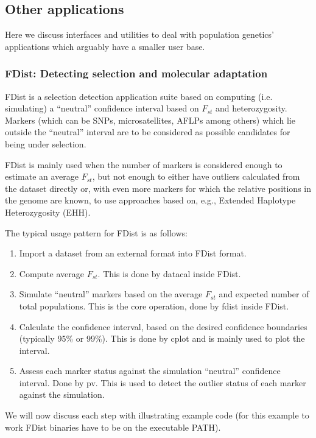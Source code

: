 \documentclass{report}
\begin{document}
\subsection{Other applications}

Here we discuss interfaces and utilities to deal with population genetics'
applications which arguably have a smaller user base.

\subsubsection{FDist: Detecting selection and molecular adaptation}

FDist is a selection detection application suite based on computing
(i.e. simulating) a ``neutral'' confidence interval based on $F_{st}$ and
heterozygosity. Markers (which can be SNPs, microsatellites, AFLPs
among others) which lie outside the ``neutral'' interval are to be
considered as possible candidates for being under selection.

FDist is mainly used when the number of markers is considered enough
to estimate an average $F_{st}$, but not enough to either have outliers
calculated from the dataset directly or, with even more markers for
which the relative positions in the genome are known, to use
approaches based on, e.g., Extended Haplotype Heterozygosity (EHH).

The typical usage pattern for FDist is as follows:

\begin{enumerate}
\item Import a dataset from an external format into FDist format.
\item Compute average $F_{st}$. This is done by datacal inside FDist.
\item Simulate ``neutral'' markers based on the
    average $F_{st}$ and expected number of total populations.
    This is the core operation, done by fdist inside FDist.
\item Calculate the confidence interval, based on the desired
    confidence boundaries (typically 95\% or 99\%). This is done by
    cplot and is mainly used to plot the interval.
\item Assess each marker status against the simulation ``neutral''
    confidence interval. Done
    by pv. This is used to detect the outlier status of each marker
    against the simulation.
\end{enumerate}

We will now discuss each step with illustrating example code
(for this example to work FDist binaries have to be on the
executable PATH).
\end{document}
